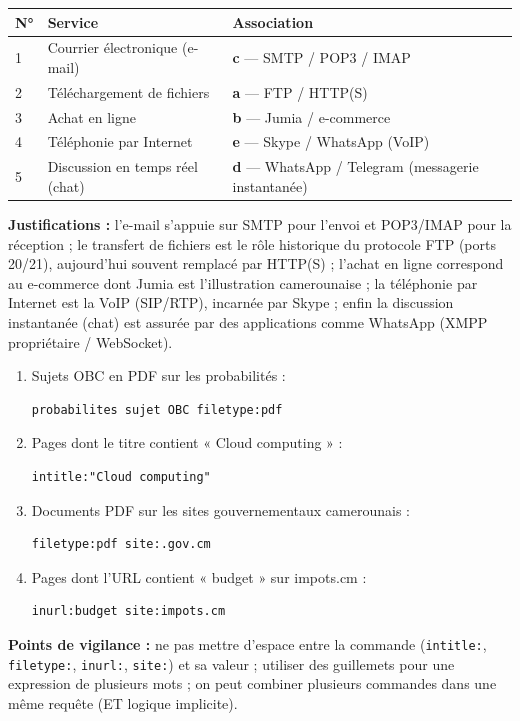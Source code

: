 \documentclass[11pt]{article}
\begin{document}
\begin{corrige}
\begin{center}
\begin{tabularx}{\linewidth}{|l|X|l|}
\hline
\rowcolor{popblueL} \textbf{N°} & \textbf{Service} & \textbf{Association} \\
\hline
1 & Courrier électronique (e-mail) & \textbf{c} — SMTP / POP3 / IMAP \\
\hline
2 & Téléchargement de fichiers & \textbf{a} — FTP / HTTP(S) \\
\hline
3 & Achat en ligne & \textbf{b} — Jumia / e-commerce \\
\hline
4 & Téléphonie par Internet & \textbf{e} — Skype / WhatsApp (VoIP) \\
\hline
5 & Discussion en temps réel (chat) & \textbf{d} — WhatsApp / Telegram (messagerie instantanée) \\
\hline
\end{tabularx}
\end{center}
\textbf{Justifications :} l'e-mail s'appuie sur SMTP pour l'envoi et POP3/IMAP pour la réception ; le transfert de fichiers est le rôle historique du protocole FTP (ports 20/21), aujourd'hui souvent remplacé par HTTP(S) ; l'achat en ligne correspond au e-commerce dont Jumia est l'illustration camerounaise ; la téléphonie par Internet est la VoIP (SIP/RTP), incarnée par Skype ; enfin la discussion instantanée (chat) est assurée par des applications comme WhatsApp (XMPP propriétaire / WebSocket).
\end{corrige}

\begin{corrige}
\begin{enumerate}
    \item Sujets OBC en PDF sur les probabilités :
\begin{lstlisting}
probabilites sujet OBC filetype:pdf
\end{lstlisting}
    \item Pages dont le titre contient « Cloud computing » :
\begin{lstlisting}
intitle:"Cloud computing"
\end{lstlisting}
    \item Documents PDF sur les sites gouvernementaux camerounais :
\begin{lstlisting}
filetype:pdf site:.gov.cm
\end{lstlisting}
    \item Pages dont l'URL contient « budget » sur impots.cm :
\begin{lstlisting}
inurl:budget site:impots.cm
\end{lstlisting}
\end{enumerate}
\textbf{Points de vigilance :} ne pas mettre d'espace entre la commande (\texttt{intitle:}, \texttt{filetype:}, \texttt{inurl:}, \texttt{site:}) et sa valeur ; utiliser des guillemets pour une expression de plusieurs mots ; on peut combiner plusieurs commandes dans une même requête (ET logique implicite).
\end{corrige}
\end{document}
